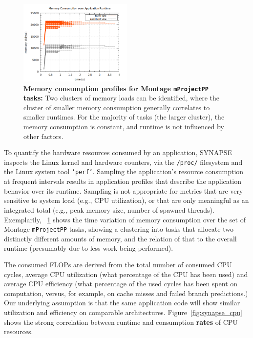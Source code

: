 \documentclass[preprint,12pt]{elsarticle}
\newcommand{\B}[1]{\textbf{#1}\xspace}
\newcommand{\T}[1]{\texttt{#1}\xspace}
\begin{document}
\begin{figure}
  \centering
  \includegraphics[width=0.5\textwidth]{experiments/synapse_montage/rs_synapse_2mass_m101_j_6_6_mprojectpp_mem}
  \caption {
      \footnotesize
      \B{Memory consumption profiles for Montage \T{mProjectPP} tasks:}
      Two clusters of memory loads can be identified, where the
      cluster of smaller memory consumption generally correlates to
      smaller runtimes.  For the majority of tasks (the larger
      cluster), the memory consumption is constant, and runtime is not
      influenced by other factors.
      \label{fig:synapse_mem_6_6}
      }
 \end{figure}
To quantify the hardware resources consumed by an application, SYNAPSE
inspects the Linux kernel and hardware counters, via the \T{/proc/}
filesystem and the Linux system tool \T{`perf'}.  Sampling the
application's resource consumption at frequent intervals results in
application profiles that describe the application behavior over its
runtime.  Sampling is not appropriate for metrics that are very 
sensitive to system load (e.g., CPU utilization), or that are only
meaningful as an integrated total (e.g., peak memory size, number of
spawned threads).
Exemplarily, \figurename~\ref{fig:synapse_mem_6_6} shows the time variation of
memory consumption over the set of Montage \T{mProjectPP} tasks, showing a
clustering into tasks that allocate two distinctly different
amounts of memory, and the relation of that to the overall runtime
(presumably due to less work being performed).

The consumed FLOPs are derived from the total number of consumed CPU
cycles, average CPU utilization (what percentage of the CPU has been
used) and average CPU efficiency (what percentage of the used cycles
has been spent on computation, versus, for example, on cache misses
and failed branch predictions.) Our underlying assumption is that
the same application code will show similar utilization and efficiency
on comparable architectures.  Figure~\ref{fig:synapse_cpu} shows the
strong correlation between runtime and consumption \B{rates} of CPU
resources.
\end{document}
